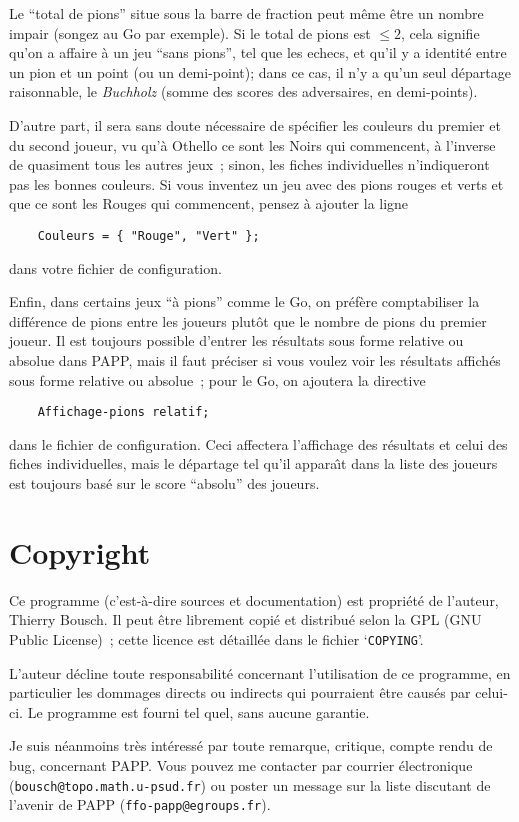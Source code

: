 \documentclass[10pt]{article}
\begin{document}
	Le ``total de pions'' situe sous la barre de fraction peut
m\^eme \^etre un nombre impair (songez au Go par exemple). Si le total
de pions est $\le2$, cela signifie qu'on a affaire \`a un jeu ``sans
pions'', tel que les echecs, et qu'il y a identit\'e entre un pion et un
point (ou un demi-point); dans ce cas, il n'y a qu'un seul d\'epartage
raisonnable, le {\em Buchholz\/} (somme des scores des adversaires, en
demi-points). 

	D'autre part, il sera sans doute n\'ecessaire de sp\'ecifier les
couleurs du premier et du second joueur, vu qu'\`a Othello ce sont les
Noirs qui commencent, \`a l'inverse de quasiment tous les autres jeux~;
sinon, les fiches individuelles n'indiqueront pas les bonnes couleurs.
Si vous inventez un jeu avec des pions rouges et verts et que ce sont
les Rouges qui commencent, pensez \`a ajouter la ligne
\begin{verbatim}
    Couleurs = { "Rouge", "Vert" };
\end{verbatim}
dans votre fichier de configuration.

	Enfin, dans certains jeux ``\`a pions'' comme le Go, on pr\'ef\`ere
comptabiliser la diff\'erence de pions entre les joueurs plut\^ot que le
nombre de pions du premier joueur. Il est toujours possible d'entrer les
r\'esultats sous forme relative ou absolue dans PAPP, mais il faut
pr\'eciser si vous voulez voir les r\'esultats affich\'es sous forme
relative ou absolue~; pour le Go, on ajoutera la directive
\begin{verbatim}
    Affichage-pions relatif;
\end{verbatim}
dans le fichier de configuration. Ceci affectera l'affichage des
r\'esultats et celui des fiches individuelles, mais le d\'epartage tel
qu'il appara{\^\i}t dans la liste des joueurs est toujours bas\'e sur le
score ``absolu'' des joueurs.

\section{Copyright}

	Ce programme (c'est-\`a-dire sources et documentation) est
propri\'et\'e de l'auteur, Thierry Bousch. Il peut \^etre librement
copi\'e et distribu\'e selon la GPL (GNU Public License)~; cette licence
est d\'etaill\'ee dans le fichier `\verb|COPYING|'.

	L'auteur d\'ecline toute responsabilit\'e concernant
l'utilisation de ce programme, en particulier les dommages directs ou
indirects qui pourraient \^etre caus\'es par celui-ci.  Le programme est
fourni tel quel, sans aucune garantie.

Je suis n\'eanmoins tr\`es int\'eress\'e par toute remarque, critique, 
compte rendu de bug, concernant PAPP. Vous pouvez me contacter par 
courrier \'electronique
(\verb|bousch@topo.math.u-psud.fr|) ou poster un message sur la liste 
discutant de l'avenir de PAPP (\verb|ffo-papp@egroups.fr|).

\newpage
\tableofcontents
\end{document}
